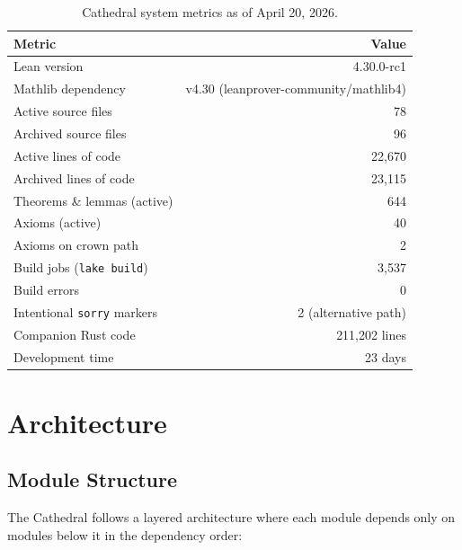 \documentclass[11pt,a4paper]{article}
\theoremstyle{definition}
\begin{document}
\begin{table}[h]
\centering
\begin{tabular}{@{}lr@{}}
\toprule
\textbf{Metric} & \textbf{Value} \\
\midrule
Lean version & 4.30.0-rc1 \\
Mathlib dependency & v4.30 (leanprover-community/mathlib4) \\
Active source files & 78 \\
Archived source files & 96 \\
Active lines of code & 22,670 \\
Archived lines of code & 23,115 \\
Theorems \& lemmas (active) & 644 \\
Axioms (active) & 40 \\
Axioms on crown path & 2 \\
Build jobs (\texttt{lake build}) & 3,537 \\
Build errors & 0 \\
Intentional \texttt{sorry} markers & 2 (alternative path) \\
Companion Rust code & 211,202 lines \\
Development time & 23 days \\
\bottomrule
\end{tabular}
\caption{Cathedral system metrics as of April 20, 2026.}
\label{tab:metrics}
\end{table}

\section{Architecture}
\label{sec:architecture}

\subsection{Module Structure}

The Cathedral follows a layered architecture where each module depends
only on modules below it in the dependency order:
\end{document}
